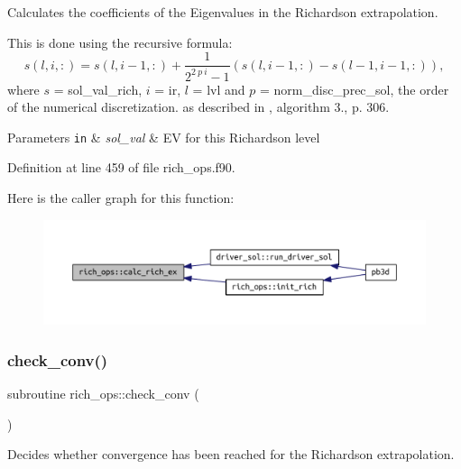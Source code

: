 Calculates the coefficients of the Eigenvalues in the Richardson extrapolation. 

This is done using the recursive formula\+: \[ s(l,i,:) = s(l,i-1,:) + \frac{1}{2^{2 \ p \ i} - 1} (s(l,i-1,:) - s(l-1,i-1,:)), \] where $s$ = {\ttfamily sol\+\_\+val\+\_\+rich}, $i$ = {\ttfamily ir}, $l$ = {\ttfamily lvl} and $p$ = {\ttfamily norm\+\_\+disc\+\_\+prec\+\_\+sol}, the order of the numerical discretization. as described in \cite{dahlquist2003numerical}, algorithm 3., p. 306.


\begin{DoxyParams}[1]{Parameters}
\mbox{\tt in}  & {\em sol\+\_\+val} & EV for this Richardson level \\
\hline
\end{DoxyParams}


Definition at line 459 of file rich\+\_\+ops.\+f90.

Here is the caller graph for this function\+:\nopagebreak
\begin{figure}[H]
\begin{center}
\leavevmode
\includegraphics[width=350pt]{namespacerich__ops_ad2717df0206a397d0d7845a96aa5da23_icgraph}
\end{center}
\end{figure}
\mbox{\label{namespacerich__ops_ac00cce686d45540b238b3b6e39c9bdeb}} 
\subsubsection{\texorpdfstring{check\+\_\+conv()}{check\_conv()}}
{\footnotesize\ttfamily subroutine rich\+\_\+ops\+::check\+\_\+conv (\begin{DoxyParamCaption}{ }\end{DoxyParamCaption})}



Decides whether convergence has been reached for the Richardson extrapolation. 

